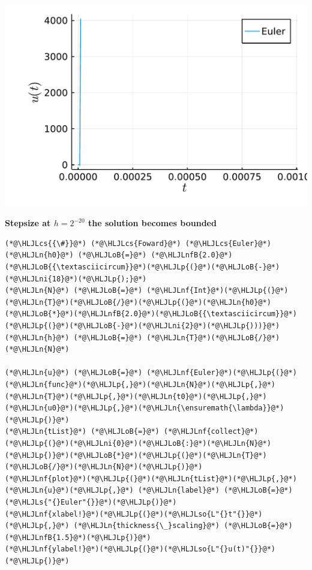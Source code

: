 \documentclass[12pt,a4paper]{article}
\newcommand{\HLJLn}[1]{#1}
\newcommand{\HLJLnf}[1]{\textcolor[RGB]{66,102,213}{#1}}
\newcommand{\HLJLs}[1]{\textcolor[RGB]{201,61,57}{#1}}
\newcommand{\HLJLso}[1]{\textcolor[RGB]{201,61,57}{#1}}
\newcommand{\HLJLnfB}[1]{\textcolor[RGB]{59,151,46}{#1}}
\newcommand{\HLJLni}[1]{\textcolor[RGB]{59,151,46}{#1}}
\newcommand{\HLJLoB}[1]{\textcolor[RGB]{102,102,102}{\textbf{#1}}}
\newcommand{\HLJLp}[1]{#1}
\newcommand{\HLJLcs}[1]{\textcolor[RGB]{153,153,119}{\textit{#1}}}
\begin{document}
\includegraphics[width=\linewidth]{figures/ass_1_report_6_1.pdf}

\textbf{Stepsize at $h = 2^{-20}$ the solution becomes bounded}


\begin{lstlisting}
(*@\HLJLcs{{\#}}@*) (*@\HLJLcs{Foward}@*) (*@\HLJLcs{Euler}@*)
(*@\HLJLn{h0}@*) (*@\HLJLoB{=}@*) (*@\HLJLnfB{2.0}@*)(*@\HLJLoB{{\textasciicircum}}@*)(*@\HLJLp{(}@*)(*@\HLJLoB{-}@*)(*@\HLJLni{18}@*)(*@\HLJLp{);}@*)
(*@\HLJLn{N}@*) (*@\HLJLoB{=}@*) (*@\HLJLnf{Int}@*)(*@\HLJLp{(}@*)(*@\HLJLn{T}@*)(*@\HLJLoB{/}@*)(*@\HLJLp{(}@*)(*@\HLJLn{h0}@*)(*@\HLJLoB{*}@*)(*@\HLJLnfB{2.0}@*)(*@\HLJLoB{{\textasciicircum}}@*)(*@\HLJLp{(}@*)(*@\HLJLoB{-}@*)(*@\HLJLni{2}@*)(*@\HLJLp{)))}@*) 
(*@\HLJLn{h}@*) (*@\HLJLoB{=}@*) (*@\HLJLn{T}@*)(*@\HLJLoB{/}@*)(*@\HLJLn{N}@*)

(*@\HLJLn{u}@*) (*@\HLJLoB{=}@*) (*@\HLJLnf{Euler}@*)(*@\HLJLp{(}@*)(*@\HLJLn{func}@*)(*@\HLJLp{,}@*)(*@\HLJLn{N}@*)(*@\HLJLp{,}@*)(*@\HLJLn{T}@*)(*@\HLJLp{,}@*)(*@\HLJLn{t0}@*)(*@\HLJLp{,}@*)(*@\HLJLn{u0}@*)(*@\HLJLp{,}@*)(*@\HLJLn{\ensuremath{\lambda}}@*)(*@\HLJLp{)}@*)
(*@\HLJLn{tList}@*) (*@\HLJLoB{=}@*) (*@\HLJLnf{collect}@*)(*@\HLJLp{(}@*)(*@\HLJLni{0}@*)(*@\HLJLoB{:}@*)(*@\HLJLn{N}@*)(*@\HLJLp{)}@*)(*@\HLJLoB{*}@*)(*@\HLJLp{(}@*)(*@\HLJLn{T}@*)(*@\HLJLoB{/}@*)(*@\HLJLn{N}@*)(*@\HLJLp{)}@*)
(*@\HLJLnf{plot}@*)(*@\HLJLp{(}@*)(*@\HLJLn{tList}@*)(*@\HLJLp{,}@*) (*@\HLJLn{u}@*)(*@\HLJLp{,}@*) (*@\HLJLn{label}@*) (*@\HLJLoB{=}@*) (*@\HLJLs{"{}Euler"{}}@*)(*@\HLJLp{)}@*)
(*@\HLJLnf{xlabel!}@*)(*@\HLJLp{(}@*)(*@\HLJLso{L"{}t"{}}@*)(*@\HLJLp{,}@*) (*@\HLJLn{thickness{\_}scaling}@*) (*@\HLJLoB{=}@*) (*@\HLJLnfB{1.5}@*)(*@\HLJLp{)}@*)
(*@\HLJLnf{ylabel!}@*)(*@\HLJLp{(}@*)(*@\HLJLso{L"{}u(t)"{}}@*)(*@\HLJLp{)}@*)
\end{lstlisting}
\end{document}
